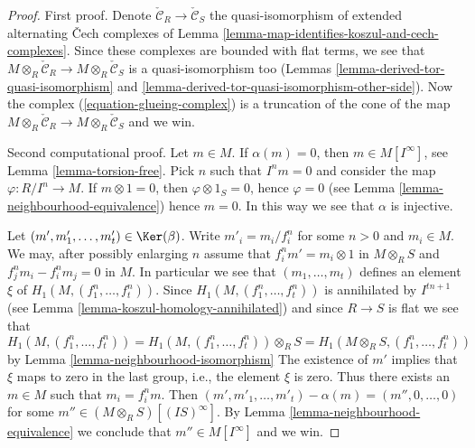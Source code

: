 \begin{proof}
First proof. Denote $\check{\mathcal{C}}_R \to \check{\mathcal{C}}_S$
the quasi-isomorphism of extended alternating {\v C}ech complexes of
Lemma \ref{lemma-map-identifies-koszul-and-cech-complexes}.
Since these complexes are bounded with flat terms, we see that
$M \otimes_R \check{\mathcal{C}}_R \to M \otimes_R \check{\mathcal{C}}_S$
is a quasi-isomorphism too (Lemmas
\ref{lemma-derived-tor-quasi-isomorphism} and
\ref{lemma-derived-tor-quasi-isomorphism-other-side}). Now the complex
(\ref{equation-glueing-complex}) is a truncation of the cone
of the map
$M \otimes_R \check{\mathcal{C}}_R \to M \otimes_R \check{\mathcal{C}}_S$
and we win.

\medskip\noindent
Second computational proof.
Let $m \in M$. If $\alpha(m) = 0$, then $m \in M[I^\infty]$, see
Lemma \ref{lemma-torsion-free}. Pick $n$ such that $I^n m = 0$
and consider the map $\varphi : R/I^n \to M$.
If $m \otimes 1 = 0$, then $\varphi \otimes 1_S = 0$, hence
$\varphi = 0$ (see
Lemma \ref{lemma-neighbourhood-equivalence})
hence $m = 0$. In this way we see that $\alpha$ is injective.

\medskip\noindent
Let $(m', m'_1, \ldots, m'_t) \in \Ker(\beta)$.
Write $m'_i = m_i/f_i^n$ for some $n > 0$ and $m_i \in M$.
We may, after possibly enlarging $n$ assume that
$f_i^n m' = m_i \otimes 1$ in $M \otimes_R S$ and
$f_j^nm_i - f_i^nm_j = 0$ in $M$.
In particular we see that
$(m_1, \ldots, m_t)$ defines an element $\xi$ of
$H_1(M, (f_1^n, \ldots, f_t^n))$.
Since $H_1(M, (f_1^n, \ldots, f_t^n))$ is annihilated by $I^{tn + 1}$ (see
Lemma \ref{lemma-koszul-homology-annihilated})
and since $R \to S$ is flat we see that
$$
H_1(M, (f_1^n, \ldots, f_t^n)) =
H_1(M, (f_1^n, \ldots, f_t^n)) \otimes_R S =
H_1(M \otimes_R S, (f_1^n, \ldots, f_t^n))
$$
by
Lemma \ref{lemma-neighbourhood-isomorphism}
The existence of $m'$ implies that $\xi$ maps to zero in the last group, i.e.,
the element $\xi$ is zero. Thus there exists an $m \in M$ such that
$m_i = f_i^n m$. Then $(m', m'_1, \ldots, m'_t) - \alpha(m)
= (m'', 0, \ldots, 0)$ for some $m'' \in (M \otimes_R S)[(IS)^\infty]$.
By
Lemma \ref{lemma-neighbourhood-equivalence}
we conclude that $m'' \in M[I^\infty]$ and we win.
\end{proof}

